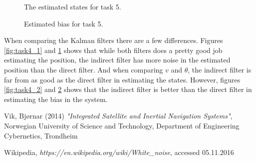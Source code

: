 \documentclass{article}
\begin{document}
\begin{figure}[!ht]
    \centering
    \caption{The estimated states for task 5.}
	\label{fig:task5_1}
\end{figure}

\begin{figure}[!ht]
    \centering
    \caption{Estimated bias for task 5.}
	\label{fig:task5_2}
\end{figure}

When comparing the Kalman filters there are a few differences. Figures \ref{fig:task4_1} and \ref{fig:task5_1} shows that while both filters does a pretty good job estimating the position, the indirect filter has more noise in the estimated position than the direct filter. And when comparing $v$ and $\theta$, the indirect filter is far from as good as the direct filter in estimating the states. However, figures \ref{fig:task4_2} and \ref{fig:task5_2} shows that the indirect filter is better than the direct filter in estimating the bias in the system.
	

\newpage
{}
\begin{thebibliography}{25}

	Vik, Bjørnar (2014)
	\emph{"Integrated Satellite and Inertial Navigation Systems"},
	Norwegian University of Science and Technology, Department of Engineering Cybernetics, Trondheim
	
	Wikipedia,
	\emph{https://en.wikipedia.org/wiki/White\_noise},
	accessed 05.11.2016
	
\end{thebibliography}
\end{document}
